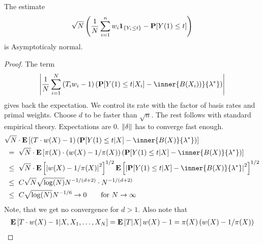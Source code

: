 \begin{theorem}
  The estimate 
  \begin{gather}
    \sqrt{N}
    \left( 
  \frac{1}{N}
    \sum_{i=1}^{n} 
    w_i
    \mathbf{1}
    _{\left\{ Y_i\le t \right\}}
    -
    \P[Y(1)\le t]
    \right)
  \end{gather}
  is Asymptoticaly normal.
\end{theorem}
\begin{proof}
The term 
\begin{gather}
    \left|  
  \frac{1}{N}
    \sum_{i=1}^{N} 
    \left( 
    T_i
    w_i
    -
    1
    \right)
    \left( 
    \P[Y(1)\le t | X_i]
    -
    \inner
    {B(X_i))}
    {\lambda^*}
    \right)
  \right|
\end{gather}
gives back the expectation. We control its rate 
with the factor of basis rates and primal weights.
Choose $d$ to be faster than $\sqrt{n}$.
The rest follows with standard empirical theory.
Expectations are 0.
$\norm{\delta}$ has to converge fast enough.
\begin{align*}
  &
  \sqrt{N}
  \cdot
  \E
  \left[ 
    \left( 
    T
    \cdot
    w(X)
    -
    1
    \right)
    \left( 
      \P
      [
      Y(1)\le t
      |X
      ]
      -
      \inner
      {B(X)}
      {\lambda^*}
    \right)
  \right]
  \\
  &
  \ 
  =
  \ 
  \sqrt{N}
  \cdot
  \E
  \left[ 
    \pi(X)
    \cdot
    \left( 
    w(X)
    -
    1
    /
    \pi(X)
    \right)
    \left( 
      \P
      [
      Y(1)\le t
      |X
      ]
      -
      \inner
      {B(X)}
      {\lambda^*}
    \right)
  \right]
  \\
  &
  \ 
  \le
  \ 
  \sqrt{N}
  \cdot
  \E
  \left[ 
    \left| 
    w(X)
    -
    1
    /
    \pi(X)
    \right|
    ^2
    \right]
    ^{1/2}
  \E
  \left[ 
    \left| 
      \P
      [
      Y(1)\le t
      |X
      ]
      -
      \inner
      {B(X)}
      {\lambda^*}
    \right|
    ^2
    \right]
    ^{1/2}
    \\
  &
  \ 
  \le
  \ 
  C
  \sqrt{N}
  \sqrt{\log(N)}
  N^{-1/(d+2)}
  \cdot
  N^{-1/(d+2)}
    \\
  &
  \ 
  \le
  \ 
  C
  \sqrt{\log(N)}
  N^{-1/6}
  \to 0
  \qquad
  \text{for}\ 
  N\to\infty
\end{align*}
Note, that we get no convergence for $d>1$. 
Also note that
\begin{gather*}
  \E
  \left[ 
    T
    \cdot
    w(X)
    -
    1
    |
    X,
    X_1,
    \ldots,
    X_N
    \right]
    =
  \E
  \left[ 
    T
    |
    X
    \right]
    w(X)
    -
    1
    =
    \pi(X)
    \left( 
      w(X)
      -
      1/\pi(X)
    \right)
\end{gather*}
\end{proof}
